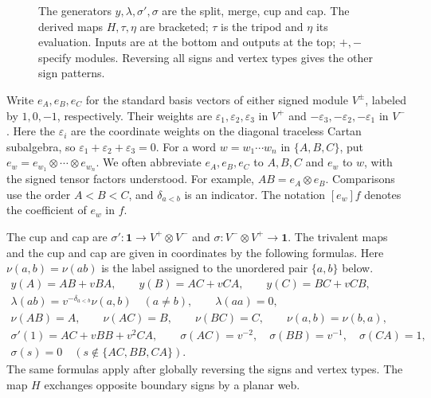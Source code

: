 \documentclass[a4paper,11pt]{amsart}
\newcommand{\one}{\mathbf1}
\newcommand{\tpar}{v}
\numberwithin{equation}{subsection}
\theoremstyle{plain}
\theoremstyle{definition}
\theoremstyle{remark}
\begin{document}
\begin{figure}[!ht]
\caption{The generators $y,\lambda,\sigma',\sigma$ are the split,
merge, cup and cap. The derived maps $H,\tau,\eta$ are bracketed;
$\tau$ is the tripod and $\eta$ its evaluation. Inputs are at the
bottom and outputs at the top; $+,-$ specify modules. Reversing
all signs and vertex types gives the other sign patterns.}
\label{fig:generators}
\end{figure}

Write $e_A,e_B,e_C$ for the standard basis vectors of either
signed module $V^\pm$, labeled by $1,0,-1$, respectively.
Their weights are $\varepsilon_1,\varepsilon_2,\varepsilon_3$
in $V^+$ and $-\varepsilon_3,-\varepsilon_2,-\varepsilon_1$ in $V^-$.
Here the $\varepsilon_i$ are the coordinate weights on the diagonal
traceless Cartan subalgebra, so $\varepsilon_1+\varepsilon_2+\varepsilon_3=0$.
For a word $w=w_1\cdots w_n$ in $\{A,B,C\}$, put
$e_w=e_{w_1}\otimes\cdots\otimes e_{w_n}$.
We often abbreviate $e_A,e_B,e_C$ to $A,B,C$ and $e_w$ to $w$,
with the signed tensor factors understood.
For example, $AB=e_A\otimes e_B$.
Comparisons use the order $A<B<C$, and $\delta_{a<b}$ is an indicator.
The notation $[e_w]f$ denotes the coefficient of $e_w$ in $f$.

The cup and cap are
$\sigma':\one\to V^+\otimes V^-$ and
$\sigma:V^-\otimes V^+\to\one$.
The trivalent maps and the cup and cap are given in coordinates
by the following formulas. Here $\nu(a,b)=\nu(ab)$ is the label assigned to the unordered pair $\{a,b\}$ below.
\begin{equation}\label{eq:localmaps}
\begin{gathered}
y(A)=AB+\tpar BA,\qquad y(B)=AC+\tpar CA,\qquad y(C)=BC+\tpar CB,\\
\lambda(ab)=\tpar^{-\delta_{a<b}}\nu(a,b)\quad(a\ne b),
\qquad \lambda(aa)=0,\\
\nu(AB)=A,\qquad \nu(AC)=B,\qquad \nu(BC)=C,
\qquad \nu(a,b)=\nu(b,a),\\[2pt]
\sigma'(1)=AC+\tpar BB+\tpar^2CA,\qquad
\sigma(AC)=\tpar^{-2},\quad \sigma(BB)=\tpar^{-1},\quad \sigma(CA)=1,\\
\sigma(s)=0\quad(s\notin\{AC,BB,CA\}).
\end{gathered}
\end{equation}
The same formulas apply after globally reversing the signs and vertex
types. The map $H$ exchanges opposite boundary signs by a planar web.
\end{document}
